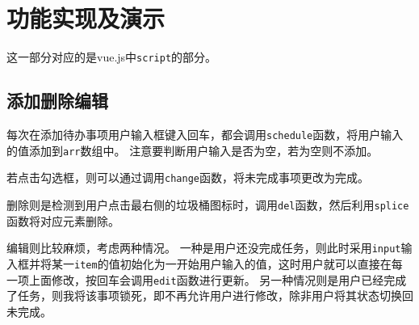 \documentclass[logo,reportComp]{thesis}
\begin{document}
\section{功能实现及演示}
这一部分对应的是vue.js中\verb'script'的部分。
\subsection{添加删除编辑}
每次在添加待办事项用户输入框键入回车，都会调用\verb'schedule'函数，将用户输入的值添加到\verb'arr'数组中。
注意要判断用户输入是否为空，若为空则不添加。

若点击勾选框，则可以通过调用\verb'change'函数，将未完成事项更改为完成。

删除则是检测到用户点击最右侧的垃圾桶图标时，调用\verb'del'函数，然后利用\verb'splice'函数将对应元素删除。

编辑则比较麻烦，考虑两种情况。
一种是用户还没完成任务，则此时采用\verb'input'输入框并将某一\verb'item'的值初始化为一开始用户输入的值，这时用户就可以直接在每一项上面修改，按回车会调用\verb'edit'函数进行更新。
另一种情况则是用户已经完成了任务，则我将该事项锁死，即不再允许用户进行修改，除非用户将其状态切换回未完成。
\end{document}
